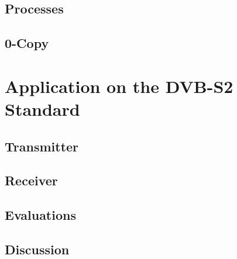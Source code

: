 \subsection{Processes}

\subsection{0-Copy}

\section{Application on the DVB-S2 Standard}

\subsection{Transmitter}

\subsection{Receiver}

\subsection{Evaluations}

\subsection{Discussion}
